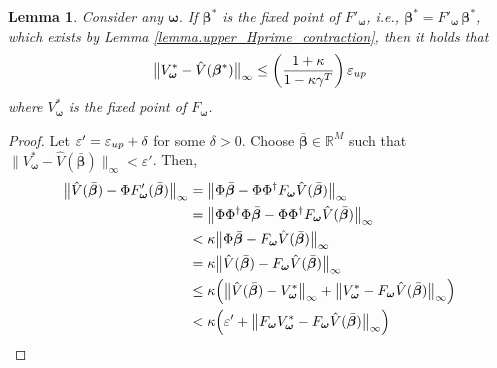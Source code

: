 \documentclass[11pt, notitlepage]{article}
\newcommand{\R}{\mathbb{R}}
\newcommand{\1}{\mathbbm{1}}
\newtheorem{lemma}{Lemma}[section]
\begin{document}
\begin{lemma} \label{lemma.upper_w_bellman}
    Consider any $\boldsymbol{\omega}$. If $\boldsymbol{\beta}^*$ is the fixed point of $F'_{\boldsymbol{\omega}}$, i.e., $\boldsymbol{\beta}^* = F'_{\boldsymbol{\omega}} \, \boldsymbol{\beta}^*$, which exists by Lemma \ref{lemma.upper_Hprime_contraction}, then it holds that
    \begin{equation*}
        \bigl \| V^*_{\boldsymbol{\omega}} - \hat{V}(\boldsymbol{\beta}^*) \bigr\|_\infty \leq \biggl(\frac{1 + \kappa}{1- \kappa \gamma^T} \biggr)\,\varepsilon_{\textnormal{up}} %
    \end{equation*}
    where $ V^*_{\boldsymbol{\omega}}$ is the fixed point of $F_{\boldsymbol{\omega}}$.
\end{lemma}
\begin{proof}
    Let $\varepsilon' = \varepsilon_{\textnormal{up}} + \delta$ for some $\delta>0$. Choose $\bar{\boldsymbol{\beta}} \in \R^M$ such that $\bigl\|V^*_{\boldsymbol{\omega}} - \hat{V}( \bar{\boldsymbol{\beta}}) \bigr\|_\infty < \varepsilon'$. Then,
    \begin{align}
        \bigl \|\hat{V}(\bar{\boldsymbol{\beta}}) - \Phi F'_{\boldsymbol{\omega}} (\bar{\boldsymbol{\beta}}) \bigr\|_\infty
        &= \bigl \|\Phi \bar{\boldsymbol{\beta}} - \Phi \Phi^{\dagger} F_{\boldsymbol{\omega}} \hat{V}(\bar{\boldsymbol{\beta}}) \bigr\|_\infty \nonumber\\
        &=\bigl \|\Phi \Phi^{\dagger} \Phi \bar{\boldsymbol{\beta}} - \Phi \Phi^{\dagger} F_{\boldsymbol{\omega}} \hat{V}(\bar{\boldsymbol{\beta}}) \bigr\|_\infty \nonumber\\
        &< \kappa \bigl \|\Phi \bar{\boldsymbol{\beta}} - F_{\boldsymbol{\omega}} \hat{V}(\bar{\boldsymbol{\beta}}) \bigr\|_\infty \label{eq.apply_phi_phi_dagger}\\
        &= \kappa \bigl \|\hat{V}(\bar{\boldsymbol{\beta}}) - F_{\boldsymbol{\omega}} \hat{V}(\bar{\boldsymbol{\beta}}) \bigr\|_\infty \nonumber\\
        &\leq \kappa \Bigl( \bigl \|\hat{V}(\bar{\boldsymbol{\beta}}) - V^*_{\boldsymbol{\omega}} \bigr\|_\infty + \bigl \|V^*_{\boldsymbol{\omega}} - F_{\boldsymbol{\omega}} \hat{V}(\bar{\boldsymbol{\beta}}) \bigr\|_\infty  \Bigr)\nonumber\\
        &< \kappa \Bigl( \varepsilon' +  \bigl\|F_{\boldsymbol{\omega}} V^*_{\boldsymbol{\omega}} - F_{\boldsymbol{\omega}} \hat{V}(\bar{\boldsymbol{\beta}})\bigr\|_\infty\Bigr) \nonumber\\

\end{align}
\end{proof}
\end{document}
